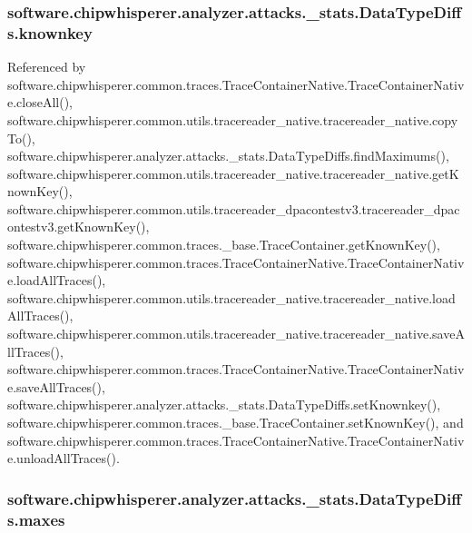 \subsubsection[{knownkey}]{\setlength{\rightskip}{0pt plus 5cm}software.\+chipwhisperer.\+analyzer.\+attacks.\+\_\+stats.\+Data\+Type\+Diffs.\+knownkey}\label{classsoftware_1_1chipwhisperer_1_1analyzer_1_1attacks_1_1__stats_1_1DataTypeDiffs_ae06b03c5b428cbf97d5d6d6927d0d149}


Referenced by software.\+chipwhisperer.\+common.\+traces.\+Trace\+Container\+Native.\+Trace\+Container\+Native.\+close\+All(), software.\+chipwhisperer.\+common.\+utils.\+tracereader\+\_\+native.\+tracereader\+\_\+native.\+copy\+To(), software.\+chipwhisperer.\+analyzer.\+attacks.\+\_\+stats.\+Data\+Type\+Diffs.\+find\+Maximums(), software.\+chipwhisperer.\+common.\+utils.\+tracereader\+\_\+native.\+tracereader\+\_\+native.\+get\+Known\+Key(), software.\+chipwhisperer.\+common.\+utils.\+tracereader\+\_\+dpacontestv3.\+tracereader\+\_\+dpacontestv3.\+get\+Known\+Key(), software.\+chipwhisperer.\+common.\+traces.\+\_\+base.\+Trace\+Container.\+get\+Known\+Key(), software.\+chipwhisperer.\+common.\+traces.\+Trace\+Container\+Native.\+Trace\+Container\+Native.\+load\+All\+Traces(), software.\+chipwhisperer.\+common.\+utils.\+tracereader\+\_\+native.\+tracereader\+\_\+native.\+load\+All\+Traces(), software.\+chipwhisperer.\+common.\+utils.\+tracereader\+\_\+native.\+tracereader\+\_\+native.\+save\+All\+Traces(), software.\+chipwhisperer.\+common.\+traces.\+Trace\+Container\+Native.\+Trace\+Container\+Native.\+save\+All\+Traces(), software.\+chipwhisperer.\+analyzer.\+attacks.\+\_\+stats.\+Data\+Type\+Diffs.\+set\+Knownkey(), software.\+chipwhisperer.\+common.\+traces.\+\_\+base.\+Trace\+Container.\+set\+Known\+Key(), and software.\+chipwhisperer.\+common.\+traces.\+Trace\+Container\+Native.\+Trace\+Container\+Native.\+unload\+All\+Traces().

\hypertarget{classsoftware_1_1chipwhisperer_1_1analyzer_1_1attacks_1_1__stats_1_1DataTypeDiffs_afb79f5cbbb929c23e7d9e2c19bfd60c6}{}
\subsubsection[{maxes}]{\setlength{\rightskip}{0pt plus 5cm}software.\+chipwhisperer.\+analyzer.\+attacks.\+\_\+stats.\+Data\+Type\+Diffs.\+maxes}\label{classsoftware_1_1chipwhisperer_1_1analyzer_1_1attacks_1_1__stats_1_1DataTypeDiffs_afb79f5cbbb929c23e7d9e2c19bfd60c6}


